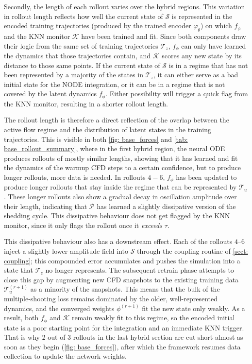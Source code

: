 Secondly, the length of each rollout varies over the hybrid regions. This variation in rollout length reflects how well the current state of $\mathcal{S}$ is represented in the encoded training trajectories (produced by the trained encoder $\varphi_\theta$) on which $f_\phi$ and the KNN monitor $\mathcal{K}$ have been trained and fit. Since both components draw their logic from the same set of training trajectories $\boldsymbol{\mathcal{T}}_z$, $f_\phi$ can only have learned the dynamics that those trajectories contain, and $\mathcal{K}$ scores any new state by its distance to those same points. If the current state of $\mathcal{S}$ is in a regime that has not been represented by a majority of the states in $\boldsymbol{\mathcal{T}}_z$, it can either serve as a bad initial state for the NODE integration, or it can be in a regime that is not covered by the latent dynamics $f_\phi$. Either possibility will trigger a quick flag from the KNN monitor, resulting in a shorter rollout length.  

The rollout length is therefore a direct reflection of the overlap between the active flow regime and the distribution of latent states in the training trajectories. This is visible in both \autoref{fig: base_forces} and \autoref{tab: base_rollout_summary}, where in the first hybrid region, the neural ODE produces rollouts of mostly similar lengths, showing that it has learned and fit the dynamics of the warmup CFD steps to a certain confidence, but to produce longer rollouts, more data is needed. In rollouts $4-6$, $f_\phi$ has been updated to produce longer rollouts that stay inside the regime that can be represented by $\boldsymbol{\mathcal{T}}_u$. These longer rollouts also show a gradual decay in oscillation amplitude over their length, indicating that $\mathcal{P}$ has learned a slightly dissipative version of the shedding cycle. This dissipative behaviour does not get flagged by the KNN monitor, since it only flags the rollout once it \emph{exceeds} $\tau$. 

This dissipative behaviour also has a downstream effect. Each of the rollouts $4$--$6$ inject a slightly lower-amplitude field into $\mathcal{S}$ through the coupling routine of \autoref{sect: coupling}; this compounded error accumulates and pushes the simulation into a state that $\boldsymbol{\mathcal{T}}_z$ no longer represents. The subsequent retrain phase attempts to close this gap by augmenting new CFD snapshots to the existing training data $\boldsymbol{\mathcal{T}}_u^{(r+1)}$ as a minority of the snapshots. This means that the bulk of the multiple-shooting loss remains dominated by the older, well-represented dynamics, and the converged weights $\phi^{(r+1)}$ fit the new state only weakly. As a result, both $f_\phi$ and $\mathcal{K}$ remain weakly fit to this regime, so the encoded initial state is a poor starting point for the integration and an immediate KNN trigger. That is why 2 out of 3 rollouts in the last hybrid section are cut short almost as soon as they begin (\autoref{fig: base_forces}), after which the framework resumes data collection to update the network weights. 

